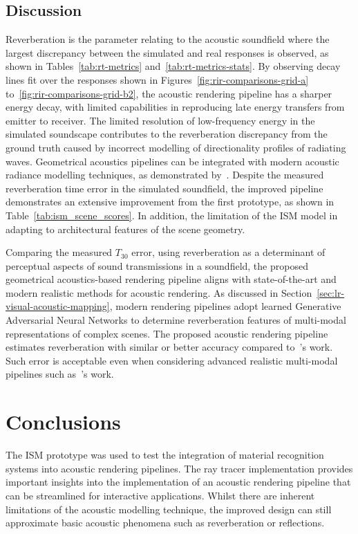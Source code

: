 \subsection{Discussion}
Reverberation is the parameter relating to the acoustic soundfield where the largest discrepancy between the simulated and real responses is observed, as shown in Tables~\ref{tab:rt-metrics} and~\ref{tab:rt-metrics-stats}. By observing decay lines fit over the responses shown in Figures~\ref{fig:rir-comparisons-grid-a} to~\ref{fig:rir-comparisons-grid-b2}, the acoustic rendering pipeline has a sharper energy decay, with limited capabilities in reproducing late energy transfers from emitter to receiver. The limited resolution of low-frequency energy in the simulated soundscape contributes to the reverberation discrepancy from the ground truth caused by incorrect modelling of directionality profiles of radiating waves. Geometrical acoustics pipelines can be integrated with modern acoustic radiance modelling techniques, as demonstrated by~\cite{siltanen2010room}. Despite the measured reverberation time error in the simulated soundfield, the improved pipeline demonstrates an extensive improvement from the first prototype, as shown in Table~\ref{tab:ism_scene_scores}. In addition, the limitation of the ISM model in adapting to architectural features of the scene geometry. \par
Comparing the measured $T_{30}$ error, using reverberation as a determinant of perceptual aspects of sound transmissions in a soundfield, the proposed geometrical acoustics-based rendering pipeline aligns with state-of-the-art and modern realistic methods for acoustic rendering. As discussed in Section~\ref{sec:lr-visual-acoustic-mapping}, modern rendering pipelines adopt learned Generative Adversarial Neural Networks to determine reverberation features of multi-modal representations of complex scenes. The proposed acoustic rendering pipeline estimates reverberation with similar or better accuracy compared to~\cite{Singh_2021_ICCV}'s work. Such error is acceptable even when considering advanced realistic multi-modal pipelines such as~\cite{schissler2014high}'s work. \par


\section{Conclusions}
The ISM prototype was used to test the integration of material recognition systems into acoustic rendering pipelines. 
The ray tracer implementation provides important insights into the implementation of an acoustic rendering pipeline that can be streamlined for interactive applications. Whilst there are inherent limitations of the acoustic modelling technique, the improved design can still approximate basic acoustic phenomena such as reverberation or reflections.